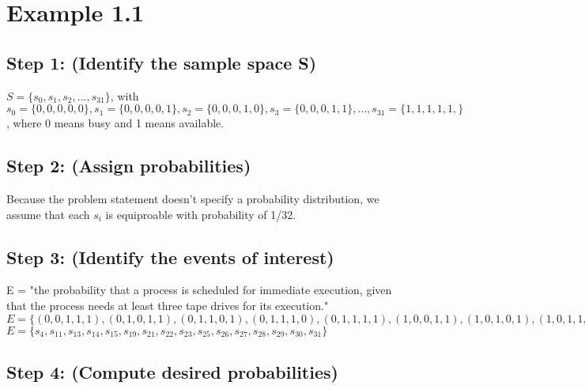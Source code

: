 \documentclass[a4paper,10pt]{article}
\title{}
\author{Mark Johnons \\
luther07@gmail.com}
\date {(312)479-2894}
\begin{document}
\maketitle
\section{Example 1.1}
\subsection{Step 1: (Identify the sample space S)}
$ S = \{s_{0}, s_{1}, s_{2},..., s_{31}\} $, with $ s_{0} = \{0,0,0,0,0\}, s_{1} = \{0,0,0,0,1\}, s_{2} = \{0,0,0,1,0\}, s_{3} = \{0,0,0,1,1\},..., s_{31} = 
\{1,1,1,1,1,\} $, where 0 means busy and 1 means available.
\subsection{Step 2: (Assign probabilities)}
Because the problem statement doesn't specify a probability distribution, we assume that each $ s_{i} $ is 
equiproable with probability of 1/32.
\subsection{Step 3: (Identify the events of interest)}
E = "the probability that a process is scheduled for immediate execution, given that the process needs at least 
three tape drives for its execution." \newline
$ E = \{(0,0,1,1,1), (0,1,0,1,1), (0,1,1,0,1), (0,1,1,1,0), (0,1,1,1,1), (1,0,0,1,1), (1,0,1,0,1), (1,0,1,1,0), 
(1,0,1,1,1), (1,1,0,0,1), (1,1,0,1,0), (1,1,0,1,1), (1,1,1,0,0), (1,1,1,0,1), (1,1,1,1,0), (1,1,1,1,1)\} $ \newline
$ E = \{s_{4}, s_{11}, s_{13}, s_{14}, s_{15}, s_{19}, s_{21}, s_{22}, s_{23}, s_{25}, s_{26}, s_{27}, s_{28}, 
s_{29}, s_{30}, s_{31}\} $
\subsection{Step 4: (Compute desired probabilities)}
\end{document}
